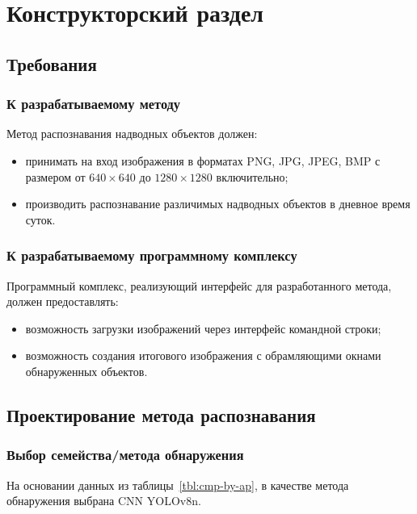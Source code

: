 \chapter{Конструкторский раздел}

\section{Требования}

\subsection*{К разрабатываемому методу}

Метод распознавания надводных объектов должен:
\begin{itemize}[label=---]
    \item принимать на вход изображения в форматах PNG, JPG, JPEG, BMP с размером от $640 \times 640$ до $1280 \times 1280$ включительно;
    \item производить распознавание различимых надводных объектов в дневное время суток.
\end{itemize}

\subsection*{К разрабатываемому программному комплексу}

Программный комплекс, реализующий интерфейс для разработанного метода, должен предоставлять:
\begin{itemize}[label=---]
    \item возможность загрузки изображений через интерфейс командной строки;
    \item возможность создания итогового изображения с обрамляющими окнами обнаруженных объектов.
\end{itemize}

\section{Проектирование метода распознавания}

\subsection{Выбор семейства/метода обнаружения}

На основании данных из таблицы~\ref{tbl:cmp-by-ap}, в качестве метода обнаружения выбрана CNN YOLOv8n.

